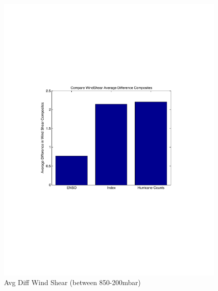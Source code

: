 \documentclass[]{article}
\begin{document}
\begin{figure}[ht]
\begin{minipage}[b]{0.6\linewidth}
\includegraphics[width=\textwidth]{figures/sensitivityResults/compositeBarGraphs/avgDiffWindShearBarGraph.pdf}
\caption{Avg Diff Wind Shear (between 850-200mbar)}
\label{fig:figure28}
\end{minipage}
\end{figure}
\end{document}

